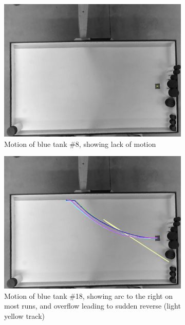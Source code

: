 \begin{figure}[h]
	\begin{subfigure}[t]{0.47\textwidth}
		\includegraphics[width=\textwidth]{../hardwareX_paper/robot_8.png}
		\caption{Motion of blue tank \#8, showing lack of motion\label{fig:tank_motion_8}}
	\end{subfigure}
	\begin{subfigure}[t]{0.47\textwidth}
		\includegraphics[width=\textwidth]{../hardwareX_paper/robot_18.png}
		\caption{Motion of blue tank \#18, showing arc to the right on most runs, and overflow leading to sudden reverse (light yellow track)\label{fig:tank_motion_18}}
	\end{subfigure}
	\caption{} %
\end{figure}

